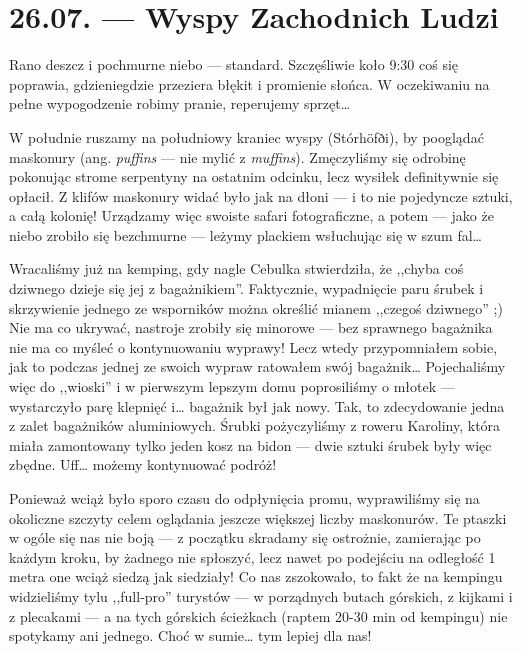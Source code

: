 \chapter*{26.07. --- Wyspy Zachodnich Ludzi}

Rano deszcz i pochmurne niebo --- standard. Szczęśliwie koło 9:30 coś się poprawia, gdzieniegdzie przeziera błękit i promienie słońca. W oczekiwaniu na pełne wypogodzenie robimy pranie, reperujemy sprzęt…


W południe ruszamy na południowy kraniec wyspy (Stórhöfði), by pooglądać maskonury (ang. \emph{puffins} --- nie mylić z \emph{muffins}). Zmęczyliśmy się odrobinę pokonując strome serpentyny na ostatnim odcinku, lecz wysiłek definitywnie się opłacił. Z klifów maskonury widać było jak na dłoni --- i to nie pojedyncze sztuki, a całą kolonię! Urządzamy więc swoiste safari fotograficzne, a potem --- jako że niebo zrobiło się bezchmurne --- leżymy plackiem wsłuchując się w szum fal…

Wracaliśmy już na kemping, gdy nagle Cebulka stwierdziła, że ,,chyba coś dziwnego dzieje się jej z bagażnikiem''. Faktycznie, wypadnięcie paru śrubek i skrzywienie jednego ze wsporników można określić mianem ,,czegoś dziwnego'' ;) Nie ma co ukrywać, nastroje zrobiły się minorowe --- bez sprawnego bagażnika nie ma co myśleć o kontynuowaniu wyprawy! Lecz wtedy przypomniałem sobie, jak to podczas jednej ze swoich wypraw ratowałem swój bagażnik… Pojechaliśmy więc do ,,wioski'' i  w pierwszym lepszym domu poprosiliśmy o młotek --- wystarczyło parę klepnięć i… bagażnik był jak nowy. Tak, to zdecydowanie jedna z zalet bagażników aluminiowych. Śrubki pożyczyliśmy z roweru Karoliny, która miała zamontowany tylko jeden kosz na bidon --- dwie sztuki śrubek były więc zbędne. Uff… możemy kontynuować podróż!

Ponieważ wciąż było sporo czasu do odpłynięcia promu, wyprawiliśmy się na okoliczne szczyty celem oglądania jeszcze większej liczby maskonurów. Te ptaszki w ogóle się nas nie boją --- z początku skradamy się ostrożnie, zamierając po każdym kroku, by żadnego nie spłoszyć, lecz nawet po podejściu na odległość 1 metra one wciąż siedzą jak siedziały! Co nas zszokowało, to fakt że na kempingu widzieliśmy tylu ,,full-pro'' turystów --- w porządnych butach górskich, z kijkami i z plecakami --- a na tych górskich ścieżkach (raptem 20-30 min od kempingu) nie spotykamy ani jednego. Choć w sumie… tym lepiej dla nas!

